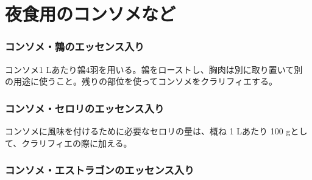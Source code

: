 \hypertarget{consomme-divers-speciaux-pour-soupers}{%
\section{夜食用のコンソメなど}\label{consomme-divers-speciaux-pour-soupers}}

\begin{recette}
\hypertarget{consome-a-l-essence-de-caille}{%
\subsubsection{コンソメ・鶉のエッセンス入り}\label{consome-a-l-essence-de-caille}}



コンソメ1 Lあたり鶉4羽を用いる。鶉をローストし、胸肉は別に取り置いて別
の用途に使うこと。残りの部位を使ってコンソメをクラリフィエする。

\hypertarget{consome-a-l-essence-de-celeri}{%
\subsubsection{コンソメ・セロリのエッセンス入り}\label{consome-a-l-essence-de-celeri}}



コンソメに風味を付けるために必要なセロリの量は、概ね 1 Lあたり 100
gとして、クラリフィエの際に加える。

\hypertarget{consome-a-l-essence-d-estragon}{%
\subsubsection{コンソメ・エストラゴンのエッセンス入り}\label{consome-a-l-essence-d-estragon}}



\end{recette}
